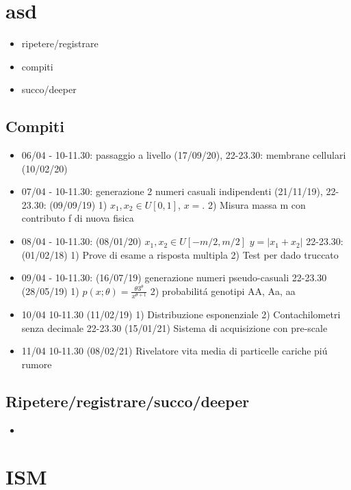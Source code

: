 \documentclass[10pt,xcolor={usenames},fleqn,mathserif,serif]{beamer}
\begin{document}
\section{asd}

\begin{itemize}
    \item ripetere/registrare
    \item compiti
    \item succo/deeper
\end{itemize}

\subsection{Compiti}

\begin{itemize}
    \item 06/04 - 10-11.30: passaggio a livello (17/09/20), 22-23.30: membrane cellulari (10/02/20)
    \item 07/04 - 10-11.30: generazione 2 numeri casuali indipendenti (21/11/19), 22-23.30: (09/09/19) 1) $x_1, x_2\in U[0,1]$, $x=$. 2) Misura massa m con contributo f di nuova fisica
    \item 08/04 - 10-11.30: (08/01/20) $x_1,x_2\in U[-m/2,m/2]$ $y=|x_1+x_2|$ 22-23.30: (01/02/18) 1) Prove di esame a risposta multipla 2) Test per dado truccato
    \item 09/04 - 10-11.30: (16/07/19) generazione numeri pseudo-casuali 22-23.30 (28/05/19) 1) $p(x;\theta)=\frac{\theta3^{\theta}}{x^{\theta+1}}$ 2) probabilit\'a genotipi AA, Aa, aa
    \item 10/04 10-11.30 (11/02/19) 1) Distribuzione esponenziale 2) Contachilometri senza decimale 22-23.30 (15/01/21) Sistema di acquisizione con pre-scale 
    \item 11/04 10-11.30 (08/02/21) Rivelatore vita media di particelle cariche pi\'u rumore
\end{itemize}

\subsection{Ripetere/registrare/succo/deeper}

\begin{itemize}
    \item 
\end{itemize}

\section{ISM}
\end{document}
